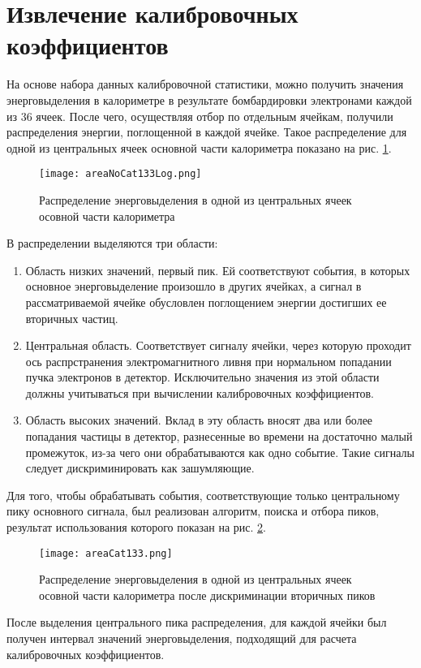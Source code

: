\newpage
\section{Извлечение калибровочных коэффициентов}  \label{chap8}

На основе набора данных калибровочной статистики, можно получить значения энерговыделения в калориметре в результате бомбардировки электронами каждой из 36 ячеек. После чего, осуществляя отбор по отдельным ячейкам, получили распределения энергии, поглощенной в каждой ячейке. Такое распределение для одной из центральных ячеек основной части калориметра показано на рис. \ref{fig:areaNoCat}.

\begin{figure}[H]
    \centering
    \texttt{[image: areaNoCat133Log.png]}
    \caption{Распределение энерговыделения в одной из центральных ячеек осовной части калориметра}
    \label{fig:areaNoCat}
\end{figure}

В распределении выделяются три области:
\begin{enumerate}[wide]
\item Область низких значений, первый пик. Ей соответствуют события, в которых основное энерговыделение произошло в других ячейках, а сигнал в рассматриваемой ячейке обусловлен поглощением энергии достигших ее вторичных частиц.
\item Центральная область. Соответствует сигналу ячейки, через которую проходит ось распрстранения электромагнитного ливня при нормальном попадании пучка электронов в детектор. Исключительно значения из этой области должны учитываться при вычислении калибровочных коэффициентов.
\item Область высоких значений. Вклад в эту область вносят два или более попадания частицы в детектор, разнесенные во времени на достаточно малый промежуток, из-за чего они обрабатываются как одно событие. Такие сигналы следует дискриминировать как зашумляющие.
\end{enumerate}

Для того, чтобы обрабатывать события, соответствующие только центральному пику основного сигнала, был реализован алгоритм, поиска и отбора пиков, результат использования которого показан на рис. \ref{fig:areaCat}.
\begin{figure}[H]
    \centering
    \texttt{[image: areaCat133.png]}
    \caption{Распределение энерговыделения в одной из центральных ячеек осовной части калориметра после дискриминации вторичных пиков}
    \label{fig:areaCat}
\end{figure}
После выделения центрального пика распределения, для каждой ячейки был получен интервал значений энерговыделения, подходящий для расчета калибровочных коэффициентов. 

